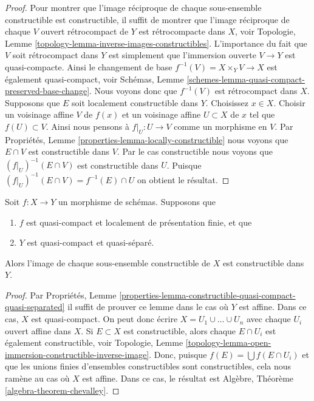 \begin{proof}
Pour montrer que l'image réciproque de chaque sous-ensemble constructible est constructible,
il suffit de montrer que l'image réciproque de chaque $V$ ouvert rétrocompact
de $Y$ est rétrocompacte
dans $X$, voir Topologie, Lemme \ref{topology-lemma-inverse-images-constructibles}. L'importance
du fait que $V$ soit rétrocompact dans
$Y$ est simplement que l'immersion ouverte $V \to Y$ est quasi-compacte.
Ainsi le changement de base $f^{-1}(V) = X \times_Y V \to X$ est également quasi-compact,
voir
Schémas, Lemme \ref{schemes-lemma-quasi-compact-preserved-base-change}. Nous voyons donc que $f^{-1}(V)$ est rétrocompact
dans $X$. Supposons que $E$ soit localement
constructible dans $Y$. Choisissez
$x \in X$. Choisir un voisinage affine $V$ de $f(x)$ et
un voisinage affine $U \subset X$ de $x$ tel que $f(U) \subset V$. Ainsi
nous pensons à $f|_U : U \to V$ comme un morphisme en $V$.
Par Propriétés, Lemme \ref{properties-lemma-locally-constructible} nous voyons
que $E \cap V$ est constructible dans $V$. Par le cas constructible
nous voyons que $(f|_U)^{-1}(E \cap V)$ est constructible
dans $U$. Puisque $(f|_U)^{-1}(E \cap V) = f^{-1}(E) \cap U$ on obtient le résultat.
\end{proof}

\begin{lemma}
\label{lemma-chevalley}
Soit $f : X \to Y$ un morphisme de schémas. Supposons
que
\begin{enumerate}
\item $f$ est quasi-compact et localement de présentation finie, et que
\item $Y$ est quasi-compact et quasi-séparé.
\end{enumerate}
Alors l'image de chaque sous-ensemble constructible de $X$ est constructible dans $Y$.
\end{lemma}

\begin{proof}
Par
Propriétés,
Lemme \ref{properties-lemma-constructible-quasi-compact-quasi-separated} il suffit de prouver ce lemme dans le cas
où $Y$ est affine. Dans ce cas, $X$
est quasi-compact. On peut donc écrire
$X = U_1 \cup \ldots \cup U_n$ avec chaque $U_i$ ouvert affine dans $X$.
Si $E \subset X$ est constructible, alors chaque $E \cap U_i$
est
également
constructible, voir Topologie, Lemme \ref{topology-lemma-open-immersion-constructible-inverse-image}. Donc,
puisque $f(E) = \bigcup f(E \cap U_i)$ et que les unions finies d'ensembles constructibles
sont constructibles, cela nous ramène au cas où
$X$ est affine. Dans ce cas, le
résultat est Algèbre, Théorème \ref{algebra-theorem-chevalley}.
\end{proof}

